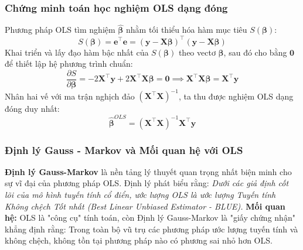 	\subsubsection{Chứng minh toán học nghiệm OLS dạng đóng}
	Phương pháp OLS tìm nghiệm $\hat{\boldsymbol{\beta}}$ nhằm tối thiểu hóa hàm mục tiêu $S(\boldsymbol{\beta})$:
	\begin{equation}
		S(\boldsymbol{\beta}) = \mathbf{e}^{\top}\mathbf{e} = (\mathbf{y} - \mathbf{X}\boldsymbol{\beta})^{\top}(\mathbf{y} - \mathbf{X}\boldsymbol{\beta})
	\end{equation}
	Khai triển và lấy đạo hàm bậc nhất của $S(\boldsymbol{\beta})$ theo vectơ $\boldsymbol{\beta}$, sau đó cho bằng $\mathbf{0}$ để thiết lập hệ phương trình chuẩn:
	\begin{equation}
		\frac{\partial S}{\partial \boldsymbol{\beta}} = -2\mathbf{X}^{\top}\mathbf{y} + 2\mathbf{X}^{\top}\mathbf{X}\boldsymbol{\beta} = \mathbf{0} \implies \mathbf{X}^{\top}\mathbf{X}\boldsymbol{\beta} = \mathbf{X}^{\top}\mathbf{y}
	\end{equation}
	Nhân hai vế với ma trận nghịch đảo $(\mathbf{X}^{\top}\mathbf{X})^{-1}$, ta thu được nghiệm OLS dạng đóng duy nhất:
	\begin{equation}\label{eq:ols_solution}
		\hat{\boldsymbol{\beta}}^{OLS} = (\mathbf{X}^{\top}\mathbf{X})^{-1} \mathbf{X}^{\top}\mathbf{y}
	\end{equation}
	
	\subsubsection{Định lý Gauss - Markov và Mối quan hệ với OLS}
	\textbf{Định lý Gauss-Markov} \cite{maddala2001} là nền tảng lý thuyết quan trọng nhất biện minh cho sự vĩ đại của phương pháp OLS. Định lý phát biểu rằng: \textit{Dưới các giả định cốt lõi của mô hình tuyến tính cổ điển, ước lượng OLS là ước lượng Tuyến tính Không chệch Tốt nhất (Best Linear Unbiased Estimator - BLUE).}
	\textbf{Mối quan hệ:} OLS là "công cụ" tính toán, còn Định lý Gauss-Markov là "giấy chứng nhận" khẳng định rằng: Trong toàn bộ vũ trụ các phương pháp ước lượng tuyến tính và không chệch, không tồn tại phương pháp nào có phương sai nhỏ hơn OLS.
	
